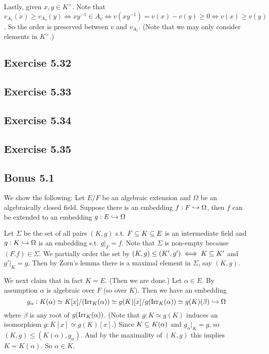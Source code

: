 \documentclass[../A&M.tex]{subfiles}
\begin{document}
Lastly, given $x,y\in K^\times$. Note that $v_{A_v}(x) \geq v_{A_v}(y) \iff xy^{-1} \in A_v \iff v(xy^{-1}) = v(x) -v(y) \geq 0 \iff v(x) \geq v(y)$. So the order is preserved between $v$ and $v_{A_v}$. (Note that we may only consider elements in $K^\times$.)

\subsection*{Exercise 5.32}

\subsection*{Exercise 5.33}

\subsection*{Exercise 5.34}

\subsection*{Exercise 5.35}

\subsection*{Bonus 5.1} \label{Bonus 5.1}

We show the following: Let $E/F$ be an algebraic extension and $\Omega$ be an algebraically closed field. Suppose there is an embedding $f: F \hookrightarrow \Omega$, then $f$ can be extended to an embedding $g: E \hookrightarrow \Omega$

Let $\Sigma$ be the set of all pairs $(K,g)$ s.t. $F\subseteq K \subseteq E$ is an intermediate field and $g: K \hookrightarrow \Omega$ is an embedding s.t. $g|_F = f$. Note that $\Sigma$ is non-empty because $(F.f) \in \Sigma$. We partially order the set by $(K,g) \leq (K',g') \iff K \subseteq K'$ and $g'|_K = g$. Then by Zorn's lemma there is a maximal element in $\Sigma$, say $(K,g)$.

We next claim that in fact $K=E$. (Then we are done.) Let $\alpha\in E$. By assumption $\alpha$ is algebraic over $F$ (so over $K$). Then we have an embedding
$$
g_\alpha: K(\alpha) \simeq K[x]/(\operatorname{Irr}_K(\alpha)) \simeq g(K)[x]/g(\operatorname{Irr}_K(\alpha)) \simeq g(K)(\beta) \hookrightarrow \Omega
$$
where $\beta$ is any root of $g(\operatorname{Irr}_K(\alpha))$. (Note that $g: K \simeq g(K)$ induces an isomorphism $g: K[x] \simeq g(K)[x]$.) Since $K \subseteq K(\alpha)$ and $g_\alpha|_K = g$, so $(K,g) \leq (K(\alpha),g_\alpha)$. And by the maximality of $(K,g)$ this implies $K=K(\alpha)$. So $\alpha \in K$.
\end{document}
